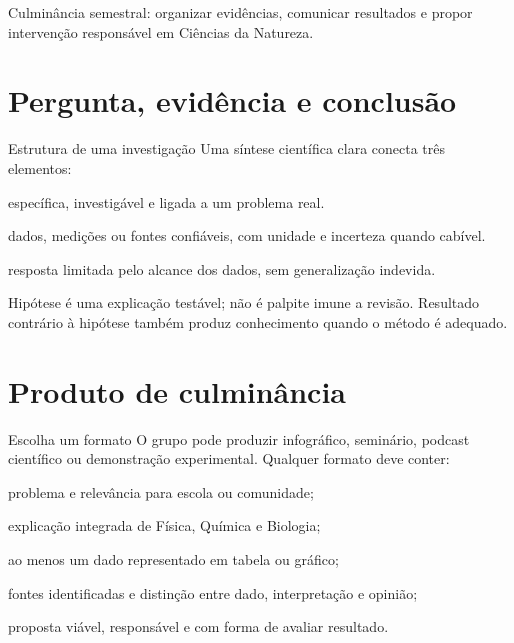 \documentclass{notaaula}
\begin{document}
        \cabecalho

        \begin{sobre}
        Culminância semestral: organizar evidências, comunicar resultados e propor intervenção responsável em Ciências da Natureza.
        \end{sobre}

        \section{Pergunta, evidência e conclusão}

\begin{copiar}{Estrutura de uma investigação}
Uma síntese científica clara conecta três elementos:
\begin{itens}
\item {} específica, investigável e ligada a um problema real.
\item {} dados, medições ou fontes confiáveis, com unidade e incerteza quando cabível.
\item {} resposta limitada pelo alcance dos dados, sem generalização indevida.
\end{itens}
Hipótese é uma explicação testável; não é palpite imune a revisão. Resultado contrário à hipótese
também produz conhecimento quando o método é adequado.
\end{copiar}

\section{Produto de culminância}

\begin{copiar}{Escolha um formato}
O grupo pode produzir infográfico, seminário, podcast científico ou demonstração experimental.
Qualquer formato deve conter:
\begin{itens}
\item problema e relevância para escola ou comunidade;
\item explicação integrada de Física, Química e Biologia;
\item ao menos um dado representado em tabela ou gráfico;
\item fontes identificadas e distinção entre dado, interpretação e opinião;
\item proposta viável, responsável e com forma de avaliar resultado.
\end{itens}
\end{copiar}
\end{document}
